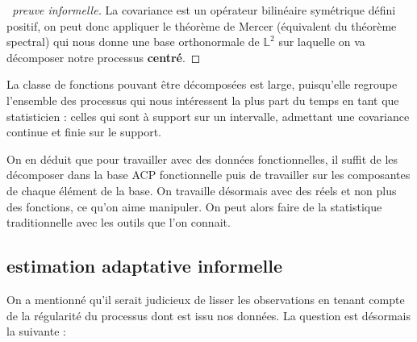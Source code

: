\begin{thm*}
    \noindent{}
    \label{thm*:KL}
\end{thm*}
\begin{proof}[\faCogs \, preuve informelle]
    La covariance est un opérateur bilinéaire symétrique défini positif, on peut donc appliquer le théorème de Mercer (équivalent du théorème spectral) qui nous donne une base orthonormale de $\mathds L^2$ sur laquelle on va décomposer notre processus \textbf{centré}.
\end{proof}
\begin{rem}
    La classe de fonctions pouvant être décomposées est large, puisqu'elle regroupe l'ensemble des processus qui nous intéressent la plus part du temps en tant que statisticien : celles qui sont à support sur un intervalle, admettant une covariance continue et finie sur le support.
\end{rem}
    
On en déduit que pour travailler avec des données fonctionnelles, il suffit de les décomposer dans la base ACP fonctionnelle puis de travailler sur les composantes de chaque élément de la base. On travaille désormais avec des réels et non plus des fonctions, ce qu'on aime manipuler. On peut alors faire de la statistique traditionnelle avec les outils que l'on connait.


\begin{propriete*}
    \noindent{}
\end{propriete*}

\subsection{estimation adaptative informelle}

On a mentionné qu'il serait judicieux de lisser les observations en tenant compte de la régularité du processus dont est issu nos données. La question est désormais la suivante :

